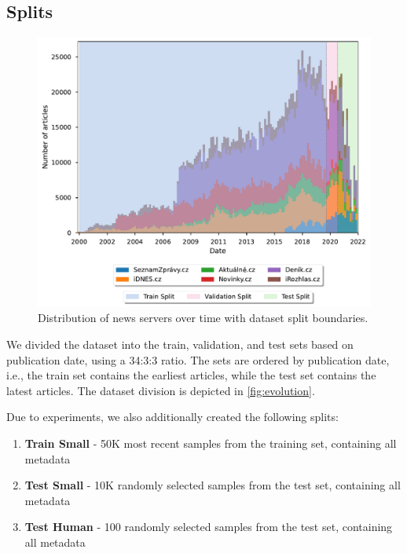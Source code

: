 \subsection{Splits}
\label{sec:splits}
\begin{figure}[h]
    \centering
    \includegraphics[width=1.0\textwidth]{img/dataset_evolution/evolution.pdf}
    \caption{Distribution of news servers over time with dataset split boundaries.}
    \label{fig:evolution}
\end{figure}
We divided the dataset into the train, validation, and test sets based on
publication date, using a 34:3:3 ratio. The sets are ordered by publication date, i.e., the train set contains the earliest articles, while the test set contains the latest articles.
The dataset division is depicted in \autoref{fig:evolution}.

Due to experiments, we also additionally created the following splits:
\begin{enumerate}
    \item\label{enum:train-small} \textbf{Train Small} - 50K most recent samples from the training set, containing all metadata
    \item\label{enum:test-small} \textbf{Test Small} - 10K randomly selected samples from the test set, containing all metadata
    \item\label{enum:test-human} \textbf{Test Human} - 100 randomly selected samples from the test set, containing all metadata
\end{enumerate}

